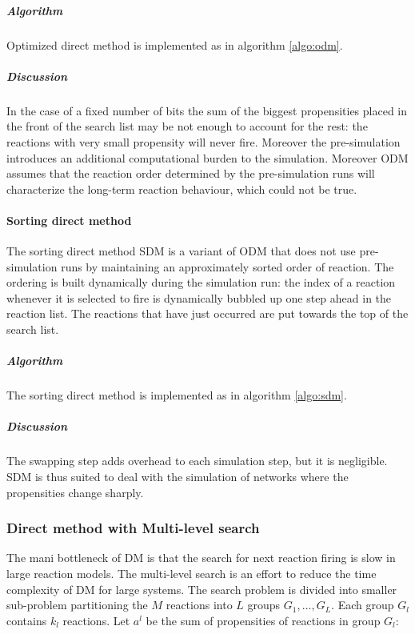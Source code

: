         \subparagraph{Algorithm}
        Optimized direct method is implemented as in algorithm \ref{algo:odm}.

        

        \subparagraph{Discussion}
        In the case of a fixed number of bits the sum of the biggest propensities placed in the front of the search list may be not enough to account for the rest: the reactions with very small propensity will never fire.
        Moreover the pre-simulation introduces an additional computational burden to the simulation.
        Moreover ODM assumes that the reaction order determined by the pre-simulation runs will characterize the long-term reaction behaviour, which could not be true.

      \paragraph{Sorting direct method}
      The sorting direct method SDM is a variant of ODM that does not use pre-simulation runs by maintaining an approximately sorted order of reaction.
      The ordering is built dynamically during the simulation run: the index of a reaction whenever it is selected to fire is dynamically bubbled up one step ahead in the reaction list.
      The reactions that have just occurred are put towards the top of the search list.

        \subparagraph{Algorithm}
        The sorting direct method is implemented as in algorithm \ref{algo:sdm}.

        

        \subparagraph{Discussion}
        The swapping step adds overhead to each simulation step, but it is negligible.
        SDM is thus suited to deal with the simulation of networks where the propensities change sharply.

    \subsubsection{Direct method with Multi-level search}
    The mani bottleneck of DM is that the search for next reaction firing is slow in large reaction models.
    The multi-level search is an effort to reduce the time complexity of DM for large systems.
    The search problem is divided into smaller sub-problem partitioning the $M$ reactions into $L$ groups $G_1, \dots, G_L$.
    Each group $G_l$ contains $k_l$ reactions.
    Let $a^l$ be the sum of propensities of reactions in group $G_l$:

